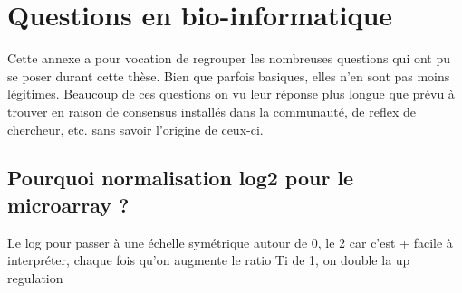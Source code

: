 \chapter{Questions en bio-informatique}

Cette annexe a pour vocation de regrouper les nombreuses questions qui ont pu se poser durant cette thèse. Bien que parfois basiques, elles n'en sont pas moins légitimes. Beaucoup de ces questions on vu leur réponse plus longue que prévu à trouver en raison de consensus installés dans la communauté, de reflex de chercheur, etc. sans savoir l'origine de ceux-ci.

\section{Pourquoi normalisation log2 pour le microarray ?}
Le log pour passer à une échelle symétrique autour de 0, le 2 car c'est + facile à interpréter, chaque fois qu'on augmente le ratio Ti de 1, on double la up regulation 

